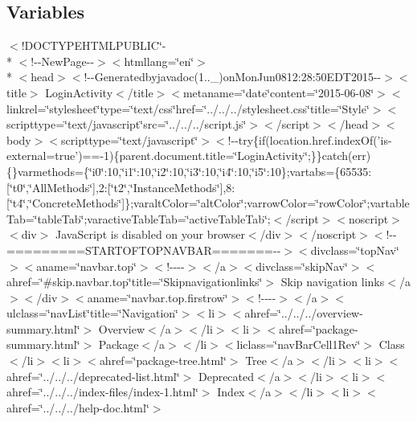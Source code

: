 \subsection*{Variables}
\begin{DoxyCompactItemize}
\item 
$<$!D\-O\-C\-T\-Y\-P\-E\-H\-T\-M\-L\-P\-U\-B\-L\-I\-C\char`\"{}-\/\\*
$<$!-\/-\/New\-Page-\/-\/$>$$<$htmllang=\char`\"{}en\char`\"{}$>$\\*
$<$head$>$$<$!-\/-\/Generatedbyjavadoc(1..\-\_)on\-Mon\-Jun0812\-:28\-:50\-E\-D\-T2015-\/-\/$>$$<$title$>$ Login\-Activity$<$/title$>$$<$metaname=\char`\"{}date\char`\"{}content=\char`\"{}2015-\/06-\/08\char`\"{}$>$$<$linkrel=\char`\"{}stylesheet\char`\"{}type=\char`\"{}text/css\char`\"{}href=\char`\"{}../../../stylesheet.\-css\char`\"{}title=\char`\"{}\-Style\char`\"{}$>$$<$scripttype=\char`\"{}text/javascript\char`\"{}src=\char`\"{}../../../script.\-js\char`\"{}$>$$<$/script$>$$<$/head$>$$<$body$>$$<$scripttype=\char`\"{}text/javascript\char`\"{}$>$$<$!-\/-\/try\{if(location.\-href.\-index\-Of('is-\/external=true')==-\/1)\{parent.\-document.\-title=\char`\"{}\-Login\-Activity\char`\"{};\}\}catch(err)\{\}varmethods=\{\char`\"{}i0\char`\"{}\-:10,\char`\"{}i1\char`\"{}\-:10,\char`\"{}i2\char`\"{}\-:10,\char`\"{}i3\char`\"{}\-:10,\char`\"{}i4\char`\"{}\-:10,\char`\"{}i5\char`\"{}\-:10\};vartabs=\{65535\-:\mbox{[}\char`\"{}t0\char`\"{},\char`\"{}\-All\-Methods\char`\"{}\mbox{]},2\-:\mbox{[}\char`\"{}t2\char`\"{},\char`\"{}\-Instance\-Methods\char`\"{}\mbox{]},8\-:\mbox{[}\char`\"{}t4\char`\"{},\char`\"{}\-Concrete\-Methods\char`\"{}\mbox{]}\};varalt\-Color=\char`\"{}alt\-Color\char`\"{};varrow\-Color=\char`\"{}row\-Color\char`\"{};vartable\-Tab=\char`\"{}table\-Tab\char`\"{};varactive\-Table\-Tab=\char`\"{}active\-Table\-Tab\char`\"{};$<$/script$>$$<$noscript$>$$<$div$>$ Java\-Script is disabled on your browser$<$/div$>$$<$/noscript$>$$<$!-\/-\/=========\-S\-T\-A\-R\-T\-O\-F\-T\-O\-P\-N\-A\-V\-B\-A\-R=======-\/-\/$>$$<$divclass=\char`\"{}top\-Nav\char`\"{}$>$$<$aname=\char`\"{}navbar.\-top\char`\"{}$>$$<$!-\/-\/-\/-\/$>$$<$/a$>$$<$divclass=\char`\"{}skip\-Nav\char`\"{}$>$$<$ahref=\char`\"{}\#skip.\-navbar.\-top\char`\"{}title=\char`\"{}\-Skipnavigationlinks\char`\"{}$>$ Skip navigation links$<$/a$>$$<$/div$>$$<$aname=\char`\"{}navbar.\-top.\-firstrow\char`\"{}$>$$<$!-\/-\/-\/-\/$>$$<$/a$>$$<$ulclass=\char`\"{}nav\-List\char`\"{}title=\char`\"{}\-Navigation\char`\"{}$>$$<$li$>$$<$ahref=\char`\"{}../../../overview-\/summary.\-html\char`\"{}$>$ Overview$<$/a$>$$<$/li$>$$<$li$>$$<$ahref=\char`\"{}package-\/summary.\-html\char`\"{}$>$ Package$<$/a$>$$<$/li$>$$<$liclass=\char`\"{}nav\-Bar\-Cell1\-Rev\char`\"{}$>$ Class$<$/li$>$$<$li$>$$<$ahref=\char`\"{}package-\/tree.\-html\char`\"{}$>$ Tree$<$/a$>$$<$/li$>$$<$li$>$$<$ahref=\char`\"{}../../../deprecated-\/list.\-html\char`\"{}$>$ Deprecated$<$/a$>$$<$/li$>$$<$li$>$$<$ahref=\char`\"{}../../../index-\/files/index-\/1.\-html\char`\"{}$>$ Index$<$/a$>$$<$/li$>$$<$li$>$$<$ahref=\char`\"{}../../../help-\/doc.\-html\char`\"{}$>$ $$
\end{DoxyCompactItemize}
